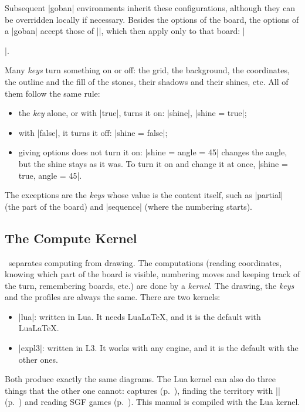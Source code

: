Subsequent |goban| environments inherit these configurations, although they can be overridden locally if necessary. Besides the options of the board, the options of a |goban| accept those of |\pgfgoset|, which then apply only to that board: |\begin{goban}[9, stone = {radius = 4pt}, mark = {line = {color = red}}]|.

\label{subsec:onoff}Many \emph{keys} turn something on or off: the grid, the background, the coordinates, the outline and the fill of the stones, their shadows and their shines, etc. All of them follow the same rule:
\begin{itemize}
	\item the \emph{key} alone, or with |true|, turns it on: |shine|, |shine = true|;
	\item with |false|, it turns it off: |shine = false|;
	\item giving options does not turn it on: |shine = {angle = 45}| changes the angle, but the shine stays as it was. To turn it on and change it at once, |shine = {true, angle = 45}|.
\end{itemize}
The exceptions are the \emph{keys} whose value is the content itself, such as |partial| (the part of the board) and |sequence| (where the numbering starts).

\subsection{The Compute Kernel}
\label{subsec:kernel}

\pgfgoname\ separates computing from drawing. The computations (reading coordinates, knowing which part of the board is visible, numbering moves and keeping track of the turn, remembering boards, etc.) are done by a \emph{kernel}. The drawing, the \emph{keys} and the profiles are always the same. There are two kernels:
\begin{itemize}
	\item |lua|: written in Lua. It needs Lua\LaTeX, and it is the default with Lua\LaTeX.
	\item |expl3|: written in L3. It works with any engine, and it is the default with the other ones.
\end{itemize}

Both produce exactly the same diagrams. The Lua kernel can also do three things that the other one cannot: captures (p.~\pageref{subsec:captures}), finding the territory with || (p.~\pageref{subsec:territory}) and reading SGF games (p.~\pageref{subsec:sgf}). This manual is compiled with the Lua kernel.


\end{goban}
